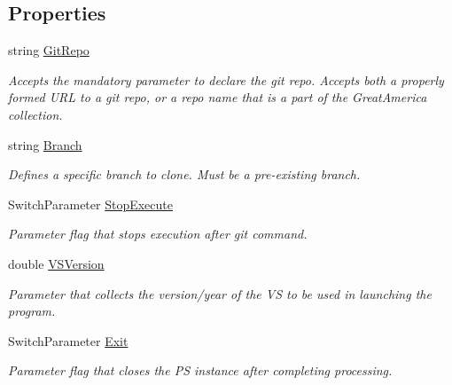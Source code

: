 \subsection*{Properties}
\begin{DoxyCompactItemize}
\item 
string \mbox{\hyperlink{class_get_repo_cmdlet_1_1_get_repo_cmdlet_ab8b0954fb74d52faa018ff0b721f7291}{Git\+Repo}}
\begin{DoxyCompactList}\small\item\em Accepts the mandatory parameter to declare the git repo. Accepts both a properly formed U\+RL to a git repo, or a repo name that is a part of the Great\+America collection. \end{DoxyCompactList}\item 
string \mbox{\hyperlink{class_get_repo_cmdlet_1_1_get_repo_cmdlet_ac98a9c9f16239f0dfd0d3649a79a66e5}{Branch}}
\begin{DoxyCompactList}\small\item\em Defines a specific branch to clone. Must be a pre-\/existing branch. \end{DoxyCompactList}\item 
Switch\+Parameter \mbox{\hyperlink{class_get_repo_cmdlet_1_1_get_repo_cmdlet_a11300c987e6547a3282664b6ff3c02d3}{Stop\+Execute}}
\begin{DoxyCompactList}\small\item\em Parameter flag that stops execution after git command. \end{DoxyCompactList}\item 
double \mbox{\hyperlink{class_get_repo_cmdlet_1_1_get_repo_cmdlet_a0fb47dd1e2551b3883abaacf1c94057c}{V\+S\+Version}}
\begin{DoxyCompactList}\small\item\em Parameter that collects the version/year of the VS to be used in launching the program. \end{DoxyCompactList}\item 
Switch\+Parameter \mbox{\hyperlink{class_get_repo_cmdlet_1_1_get_repo_cmdlet_a9e8a15001d9ad8bc691ebfb75a7a5993}{Exit}}
\begin{DoxyCompactList}\small\item\em Parameter flag that closes the PS instance after completing processing. \end{DoxyCompactList}\end{DoxyCompactItemize}
